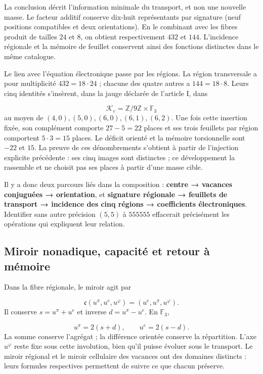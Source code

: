 La conclusion décrit l'information minimale du transport, et non une
nouvelle masse. Le facteur additif conserve dix-huit représentants par signature
(neuf positions compatibles et deux orientations). En le combinant avec les
fibres produit de tailles \(24\) et \(8\), on obtient respectivement
\(432\) et \(144\). L'incidence régionale et la mémoire de feuillet conservent
ainsi des fonctions distinctes dans le même catalogue.



Le lien avec l'équation électronique passe par les régions. La région transversale a pour multiplicité \(432=18\cdot24\) ; chacune des quatre autres a \(144=18\cdot8\). Leurs cinq identités s'insèrent, dans la jauge déclarée de l'article I, dans

\[
\mathcal K_e=\mathbb Z/9\mathbb Z\times\mathbb F_3
\]
au moyen de \((4,0),(5,0),(6,0),(6,1),(6,2)\). Une fois cette insertion fixée, son complément comporte \(27-5=22\) places et ses trois feuillets par région comportent \(5\cdot3=15\) places. Le déficit orienté et la mémoire torsionnelle sont \(-22\) et \(15\). La preuve de ces dénombrements s'obtient à partir de l'injection explicite précédente : ses cinq images sont distinctes ; ce développement la rassemble et ne choisit pas ses places à partir d'une masse cible.

Il y a donc deux parcours liés dans la composition : \textbf{centre → vacances conjuguées → orientation}, et \textbf{signature régionale → feuillets de transport → incidence des cinq régions → coefficients électroniques}. Identifier sans autre précision \((5,5)\) à \(555555\) effacerait précisément les opérations qui expliquent leur relation.

\subsection{Miroir nonadique, capacité et retour à mémoire}
Dans la fibre régionale, le miroir agit par

\[
\mathfrak c(u^\pi,u^e,u^\varphi)=(u^e,u^\pi,u^\varphi).
\]
Il conserve \(s=u^\pi+u^e\) et inverse \(d=u^\pi-u^e\). En \(\mathbb F_3\),

\[
u^\pi=2(s+d),\qquad u^e=2(s-d).
\]
La somme conserve l'agrégat ; la différence orientée conserve la répartition. L'axe \(u^\varphi\) reste fixe sous cette involution, bien qu'il puisse évoluer sous le transport. Le miroir régional et le miroir cellulaire des vacances ont des domaines distincts : leurs formules respectives permettent de suivre ce que chacun préserve.

